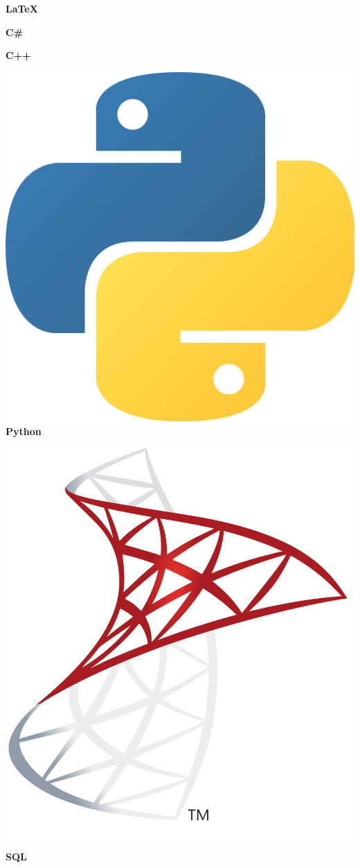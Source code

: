 \documentclass[a4paper]{friggeri-cv}
\begin{document}
\begin{aside}
        \textbf{\LaTeX}%

        \textbf{C\#}%

        \textbf{C++}%

        \includegraphics[scale=0.0045]{../assets/images/logos/Python_logo.png} \textbf{Python}%

        \includegraphics[scale=0.008]{../assets/images/logos/SQL_logo.png} \textbf{SQL}%


\end{aside}
\end{document}
